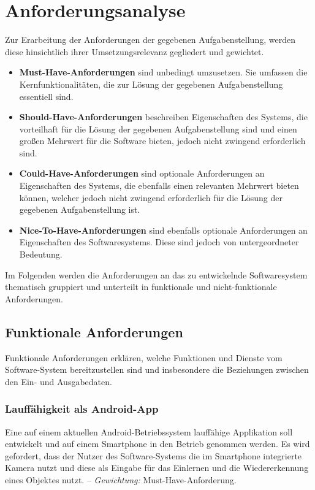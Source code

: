 \documentclass[oneside]{ausarbeitung}
\begin{document}
\chapter{Anforderungsanalyse}
\label{cha:analyse}
Zur Erarbeitung der Anforderungen der gegebenen Aufgabenstellung, werden diese hinsichtlich ihrer Umsetzungsrelevanz gegliedert und gewichtet.
\begin{itemize}
\item \textbf{Must-Have-Anforderungen} sind unbedingt umzusetzen. Sie umfassen die Kernfunktionalitäten, die zur Lösung der gegebenen Aufgabenstellung essentiell sind.
\item \textbf{Should-Have-Anforderungen} beschreiben Eigenschaften des Systems, die vorteilhaft für die Lösung der gegebenen Aufgabenstellung sind und einen großen Mehrwert für die Software bieten, jedoch nicht zwingend erforderlich sind.
\item \textbf{Could-Have-Anforderungen} sind optionale Anforderungen an Eigenschaften des Systems, die ebenfalls einen relevanten Mehrwert bieten können, welcher jedoch nicht zwingend erforderlich für die Lösung der gegebenen Aufgabenstellung ist. 
\item \textbf{Nice-To-Have-Anforderungen} sind ebenfalls optionale Anforderungen an Eigenschaften des Softwaresystems. Diese sind jedoch von untergeordneter Bedeutung.
\end{itemize}
Im Folgenden werden die Anforderungen an das zu entwickelnde Softwaresystem thematisch gruppiert und unterteilt in funktionale und nicht-funktionale Anforderungen.
\section{Funktionale Anforderungen}
Funktionale Anforderungen erklären, welche Funktionen und Dienste vom Software-System bereitzustellen sind und insbesondere die Beziehungen zwischen den Ein- und Ausgabedaten.

\subsection{Lauffähigkeit als Android-App}
Eine auf einem aktuellen Android-Betriebssystem lauffähige Applikation soll entwickelt und auf einem Smartphone in den Betrieb genommen werden. Es wird gefordert, dass der Nutzer des Software-Systems die im Smartphone integrierte Kamera nutzt und diese als Eingabe für das Einlernen und die Wiedererkennung eines Objektes nutzt.  -- \textit{Gewichtung:} Must-Have-Anforderung.
\end{document}
